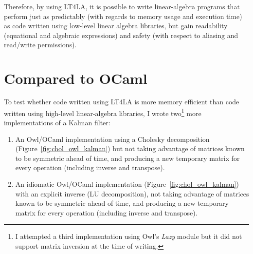 Therefore, by using LT4LA, it is possible to write linear-algebra programs that
perform just as predictably (with regards to memory usage and execution time)
as code written using low-level linear algebra libraries, but gain readability
(equational and algebraic expressions) and safety (with respect to aliasing
and read/write permissions).

\section{Compared to OCaml}

To test whether code written using LT4LA is more memory efficient than code
written using high-level linear-algebra libraries, I wrote two\footnote{I
attempted a third implementation using Owl's \emph{Lazy} module but it did
not support matrix inversion at the time of writing.} more implementations
of a Kalman filter:

\begin{enumerate}
    \item An Owl/OCaml implementation using a Cholesky decomposition
        (Figure~\ref{fig:chol_owl_kalman}) but not taking advantage of matrices
        known to be symmetric ahead of time, and producing a new temporary
        matrix for every operation (including inverse and transpose).

    \item An idiomatic Owl/OCaml implementation
        (Figure~\ref{fig:chol_owl_kalman}) with an explicit inverse (LU
        decomposition), not taking advantage of matrices known to be symmetric
        ahead of time, and producing a new temporary matrix for every operation
        (including inverse and transpose).
\end{enumerate}


